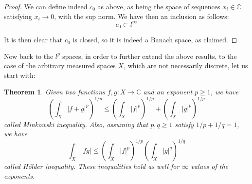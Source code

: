 \documentclass[12pt]{amsbook}
\newtheorem{theorem}{Theorem}[chapter]
\begin{document}
\begin{proof}
We can define indeed $c_0$ as above, as being the space of sequences $x_i\in\mathbb C$ satisfying $x_i\to0$, with the sup norm. We have then an inclusion as follows:
$$c_0\subset l^\infty$$

It is then clear that $c_0$ is closed, so it is indeed a Banach space, as claimed. 
\end{proof}

Now back to the $l^p$ spaces, in order to further extend the above results, to the case of the arbitrary measured spaces $X$, which are not necessarily discrete, let us start with:


\begin{theorem}
Given two functions $f,g:X\to\mathbb C$ and an exponent $p\geq1$, we have
$$\left(\int_X|f+g|^p\right)^{1/p}\leq\left(\int_X|f|^p\right)^{1/p}+\left(\int_X|g|^p\right)^{1/p}$$
called Minkowski inequality. Also, assuming that $p,q\geq1$ satisfy $1/p+1/q=1$, we have
$$\int_X|fg|\leq \left(\int_X|f|^p\right)^{1/p}\left(\int_X|g|^q\right)^{1/q}$$
called H\"older inequality. These inequalities hold as well for $\infty$ values of the exponents.
\end{theorem}
\end{document}
